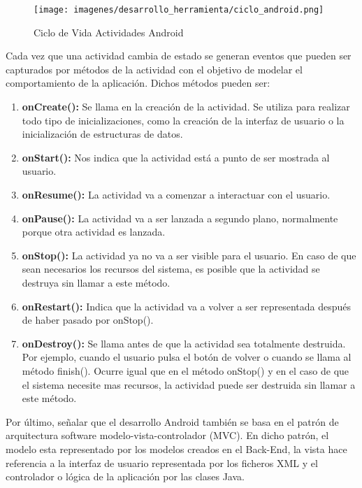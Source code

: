 \documentclass[a4paper,11pt]{book}
\begin{document}
\begin{figure}[H] 
\centering 
\texttt{[image: imagenes/desarrollo\_herramienta/ciclo\_android.png]}
\caption{ Ciclo de Vida Actividades Android\cite{colD}}
\end{figure}

Cada vez que una actividad cambia de estado se generan eventos que pueden ser capturados por métodos de la actividad con el objetivo de modelar el comportamiento de la aplicación. Dichos métodos pueden ser: 
\begin{enumerate}
\item \textbf{onCreate():} Se llama en la creación de la actividad. Se utiliza para realizar todo tipo de inicializaciones, como la creación de la interfaz de usuario o la inicialización de estructuras de datos. 
\item \textbf{onStart():} Nos indica que la actividad está a punto de ser mostrada al usuario.
\item \textbf{onResume():} La actividad va a comenzar a interactuar con el usuario. 
\item \textbf{onPause():} La actividad va a ser lanzada a segundo plano, normalmente porque otra actividad es lanzada. 
\item \textbf{onStop():} La actividad ya no va a ser visible para el usuario. En caso de que sean necesarios los recursos del sistema, es posible que la actividad se destruya sin llamar a este método.
\item \textbf{onRestart():} Indica que la actividad va a volver a ser representada después de haber pasado por onStop().
\item \textbf{onDestroy():} Se llama antes de que la actividad sea totalmente destruida. Por ejemplo, cuando el usuario pulsa el botón de volver o cuando se llama al método finish(). Ocurre igual que en el método onStop() y en el caso de que el sistema necesite mas recursos, la actividad puede ser destruida sin llamar a este método. 
\end{enumerate}

Por último, señalar que el desarrollo Android también se basa en el patrón de arquitectura software modelo-vista-controlador (MVC). En dicho patrón, el modelo esta representado por los modelos creados en el Back-End, la vista hace referencia a la interfaz de usuario representada por los ficheros XML y el controlador o lógica de la aplicación por las clases Java. 
\end{document}
